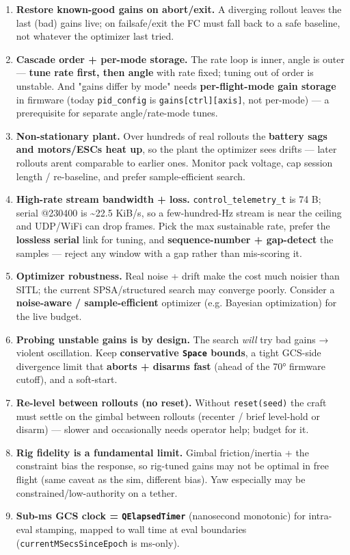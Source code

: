 \documentclass[
  11pt,
]{article}
\begin{document}
\begin{enumerate}
  only the final accepted gains.
\item
  \textbf{Restore known-good gains on abort/exit.} A diverging rollout
  leaves the last (bad) gains live; on failsafe/exit the FC must fall
  back to a safe baseline, not whatever the optimizer last tried.
\item
  \textbf{Cascade order + per-mode storage.} The rate loop is inner,
  angle is outer --- \textbf{tune rate first, then angle} with rate
  fixed; tuning out of order is unstable. And "gains differ by mode"
  needs \textbf{per-flight-mode gain storage} in firmware (today
  \texttt{pid\_config} is \texttt{gains{[}ctrl{]}{[}axis{]}}, not
  per-mode) --- a prerequisite for separate angle/rate-mode tunes.
\item
  \textbf{Non-stationary plant.} Over hundreds of real rollouts the
  \textbf{battery sags and motors/ESCs heat up}, so the plant the
  optimizer sees drifts --- later rollouts aren\textquotesingle t
  comparable to earlier ones. Monitor pack voltage, cap session length /
  re-baseline, and prefer sample-efficient search.
\item
  \textbf{High-rate stream bandwidth + loss.}
  \texttt{control\_telemetry\_t} is 74 B; serial @230400 is
  \textasciitilde22.5 KiB/s, so a few-hundred-Hz stream is near the
  ceiling and UDP/WiFi can drop frames. Pick the max sustainable rate,
  prefer the \textbf{lossless serial} link for tuning, and
  \textbf{sequence-number + gap-detect} the samples --- reject any
  window with a gap rather than mis-scoring it.
\item
  \textbf{Optimizer robustness.} Real noise + drift make the cost much
  noisier than SITL; the current SPSA/structured search may converge
  poorly. Consider a \textbf{noise-aware / sample-efficient} optimizer
  (e.g. Bayesian optimization) for the live budget.
\item
  \textbf{Probing unstable gains is by design.} The search \emph{will}
  try bad gains → violent oscillation. Keep \textbf{conservative
  \texttt{Space} bounds}, a tight GCS-side divergence limit that
  \textbf{aborts + disarms fast} (ahead of the 70° firmware cutoff), and
  a soft-start.
\item
  \textbf{Re-level between rollouts (no reset).} Without
  \texttt{reset(seed)} the craft must settle on the gimbal between
  rollouts (recenter / brief level-hold or disarm) --- slower and
  occasionally needs operator help; budget for it.
\item
  \textbf{Rig fidelity is a fundamental limit.} Gimbal friction/inertia
  + the constraint bias the response, so rig-tuned gains may not be
  optimal in free flight (same caveat as the sim, different bias). Yaw
  especially may be constrained/low-authority on a tether.
\item
  \textbf{Sub-ms GCS clock = \texttt{QElapsedTimer}} (nanosecond
  monotonic) for intra-eval stamping, mapped to wall time at eval
  boundaries (\texttt{currentMSecsSinceEpoch} is ms-only).
\end{enumerate}
\end{document}
